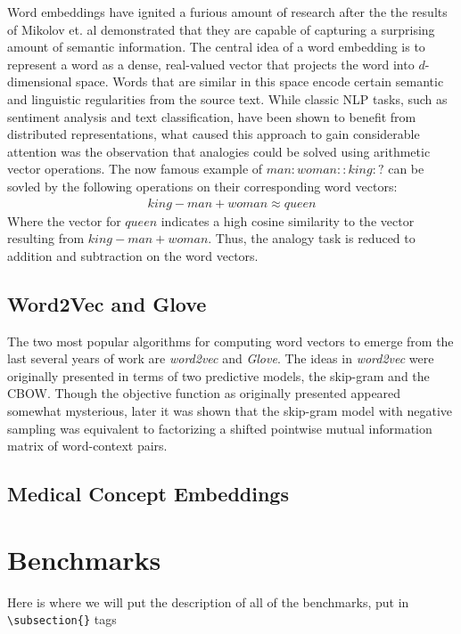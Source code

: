 \documentclass{ws-procs11x85}
\begin{document}
Word embeddings have ignited a furious amount of research after the the results of Mikolov\cite{mikolov2013distributed} et. al demonstrated that they are capable of capturing a surprising amount of semantic information. The central idea of a word embedding is to represent a word as a dense, real-valued vector that projects the word into $d$-dimensional space. Words that are similar in this space encode certain semantic and linguistic regularities from the source text. While classic NLP tasks, such as sentiment analysis and text classification, have been shown to benefit from distributed representations, what caused this approach to gain considerable attention was the observation that analogies could be solved using arithmetic vector operations. The now famous example of $man:woman::king:?$ can be sovled by the following operations on their corresponding word vectors: 
\begin{align*}
king - man + woman \approx queen
\end{align*}
Where the vector for $queen$ indicates a high cosine similarity to the vector resulting from $king - man + woman$. Thus, the analogy task is reduced to addition and subtraction on the word vectors.

 \subsection{Word2Vec and Glove}
The two most popular algorithms for computing word vectors to emerge from the last several years of work are \emph{word2vec}\cite{mikolov2013distributed} and \emph{Glove}\cite{pennington2014glove}. The ideas in \emph{word2vec} were originally presented in terms of two predictive models, the skip-gram and the CBOW. Though the objective function as originally presented appeared somewhat mysterious, later it was shown that the skip-gram model with negative sampling was equivalent to factorizing a shifted pointwise mutual information matrix\cite{levy2014neural} of word-context pairs.

 \subsection{Medical Concept Embeddings}

\section{Benchmarks}
Here is where we will put the description of all of the benchmarks, put in \verb|\subsection{}| tags
\end{document}
